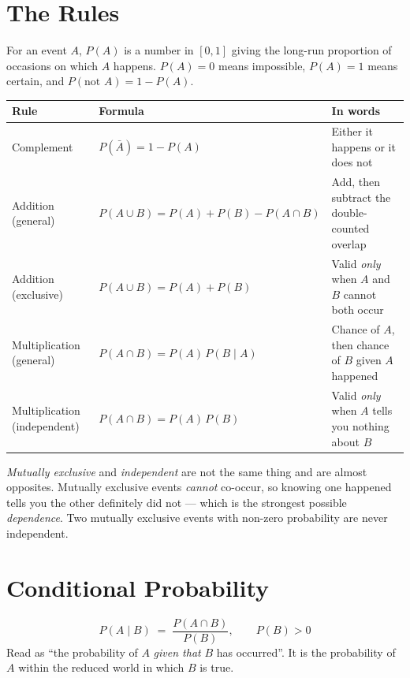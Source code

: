 \section{The Rules}

\begin{definitionbox}[Probability]
For an event $A$, $P(A)$ is a number in $[0,1]$ giving the long-run proportion of
occasions on which $A$ happens. $P(A)=0$ means impossible, $P(A)=1$ means certain,
and $P(\text{not }A) = 1 - P(A)$.
\end{definitionbox}

\begin{longtable}{@{}L{3.3cm}L{5.0cm}L{6.3cm}@{}}
\toprule
{}
\textbf{Rule} & \textbf{Formula} & \textbf{In words} \\
\midrule
\endhead
Complement & $P(\bar{A}) = 1 - P(A)$ & Either it happens or it does not \\
Addition (general) & $P(A \cup B) = P(A) + P(B) - P(A \cap B)$ & Add, then subtract the double-counted overlap \\
Addition (exclusive) & $P(A \cup B) = P(A) + P(B)$ & Valid \emph{only} when $A$ and $B$ cannot both occur \\
Multiplication (general) & $P(A \cap B) = P(A)\,P(B \mid A)$ & Chance of $A$, then chance of $B$ given $A$ happened \\
Multiplication (independent) & $P(A \cap B) = P(A)\,P(B)$ & Valid \emph{only} when $A$ tells you nothing about $B$ \\
\bottomrule
\end{longtable}

\begin{alertbox}
\emph{Mutually exclusive} and \emph{independent} are not the same thing and are
almost opposites. Mutually exclusive events \emph{cannot} co-occur, so knowing one
happened tells you the other definitely did not --- which is the strongest possible
\emph{dependence}. Two mutually exclusive events with non-zero probability are
never independent.
\end{alertbox}

\section{Conditional Probability}

\begin{definitionbox}
\[
P(A \mid B) \;=\; \frac{P(A \cap B)}{P(B)}, \qquad P(B) > 0
\]
Read as ``the probability of $A$ \emph{given that} $B$ has occurred''. It is the
probability of $A$ within the reduced world in which $B$ is true.
\end{definitionbox}


